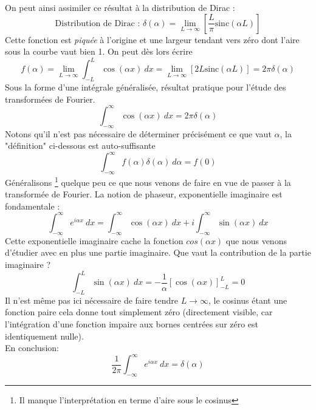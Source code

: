 On peut ainsi assimiler ce résultat à la distribution de Dirac :
\begin{equation}
\text{Distribution de Dirac : } \delta(\alpha) = \lim\limits_{L\rightarrow\infty}\left[
\dfrac{L}{\pi}\text{sinc}(\alpha L)\right]
\end{equation}
Cette fonction est \textit{piquée} à l’origine et une largeur tendant vers zéro dont l'aire
sous la courbe vaut bien 1. On peut dès lors écrire
\begin{equation}
f(\alpha) = \lim\limits_{L\rightarrow\infty} \int_{-L}^L \cos(\alpha x)\ dx = \lim\limits_{L 
\rightarrow \infty}[2L\text{sinc}(\alpha L)] = 2\pi \delta(\alpha)
\end{equation}
Sous la forme d'une intégrale généralisée, résultat pratique pour l'étude des transformées 
de Fourier.
\begin{equation}
\int_{-\infty}^\infty \cos(\alpha x)\ dx = 2\pi \delta (\alpha)
\end{equation}
Notons qu'il n'est pas nécessaire de déterminer précisément ce que vaut $\alpha$, la 
"définition" ci-dessous est auto-suffisante
\begin{equation}
\int_{-\infty}^\infty f(\alpha)\delta(\alpha)\ d\alpha = f(0)
\end{equation}
Généralisons \footnote{Il manque l'interprétation en terme d'aire sous le cosinus} quelque
 peu ce que nous venons de faire en vue de passer à la transformée de 
Fourier. La notion de phaseur, exponentielle imaginaire est fondamentale :
\begin{equation}
\int_{-\infty}^\infty e^{i\alpha x}\ dx = \int_{-\infty}^\infty \cos(\alpha x)\ dx + i
\int_{-\infty}^\infty \sin(\alpha x)\ dx
\end{equation}
Cette exponentielle imaginaire cache la fonction $cos(\alpha x)$ que nous venons d'étudier 
avec en plus une partie imaginaire. Que vaut la contribution de la partie imaginaire ? 
\begin{equation}
\int_{-L}^L \sin(\alpha x)\ dx = -\frac{1}{\alpha}\left[\cos(\alpha x)\right]^L_{-L} = 0
\end{equation}
Il n'est même pas ici nécessaire de faire tendre $L\rightarrow\infty$, le cosinus étant 
une fonction paire cela donne tout simplement zéro (directement visible, car l'intégration 
d'une fonction impaire aux bornes centrées sur zéro est identiquement nulle). \\
En conclusion:
\begin{equation}
\dfrac{1}{2\pi}\int_{-\infty}^\infty e^{i\alpha x}\ dx  = \delta(\alpha)
\end{equation}

